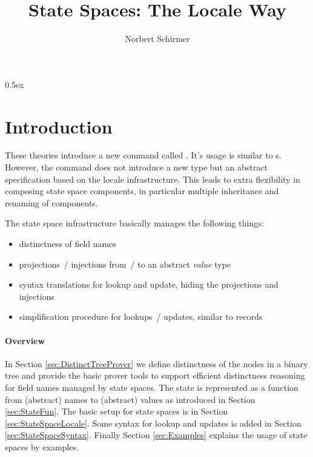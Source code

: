 \documentclass[11pt,a4paper]{article}
\begin{document}
\title{State Spaces: The Locale Way}
\author{Norbert Schirmer}
\maketitle

\tableofcontents

\parindent 0pt\parskip 0.5ex

\section{Introduction}

These theories introduce a new command called . 
It's usage is similar to s. However, the command does not introduce a new type but an
abstract specification based on the locale infrastructure. This leads
to extra flexibility in composing state space components, in particular
multiple inheritance and renaming of components.

The state space infrastructure basically manages the following things:
\begin{itemize}
\item distinctness of field names
\item projections~/ injections from~/ to an abstract \emph{value} type
\item syntax translations for lookup and update, hiding the projections and injections
\item simplification procedure for lookups~/ updates, similar to records
\end{itemize}


\paragraph{Overview}
In Section \ref{sec:DistinctTreeProver} we define distinctness of the nodes in a binary tree and provide the basic prover tools to support efficient distinctness reasoning for field names managed by 
state spaces. The state is represented as a function from (abstract) names to (abstract) values as
introduced in Section \ref{sec:StateFun}. The basic setup for state spaces is in Section 
\ref{sec:StateSpaceLocale}. Some syntax for lookup and updates is added in Section \ref{sec:StateSpaceSyntax}. Finally Section \ref{sec:Examples} explains the usage of state spaces by examples.




%
%
\end{document}
